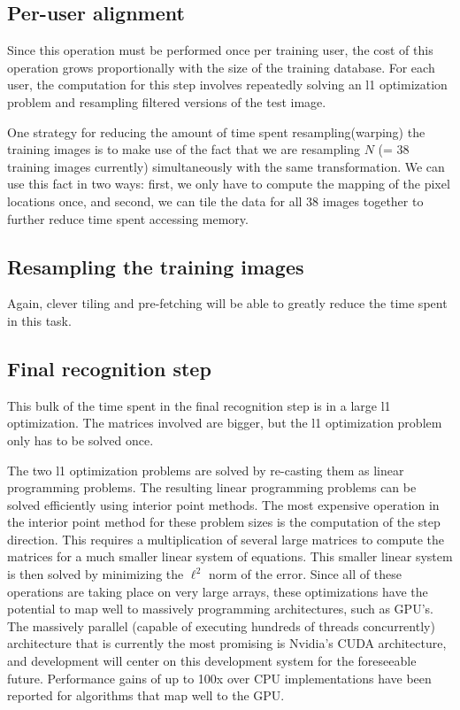 \subsection{Per-user alignment}  
Since this operation must be performed once per training user, the cost of this
operation grows proportionally with the size of the training database.  For
each user, the computation for this step involves repeatedly solving an l1
optimization problem and resampling filtered versions of the test image.  

One strategy for reducing the amount of time spent resampling(warping) the
training images is to make use of the fact that we are resampling $N$ (= 38
training images currently) simultaneously with the same transformation.  We can
use this fact in two ways: first, we only have to compute the mapping of the
pixel locations once, and second, we can tile the data for all 38 images
together to further reduce time spent accessing memory.   

\subsection{Resampling the training images}  
Again, clever tiling and pre-fetching will be able to greatly reduce the time spent in this task.

\subsection{Final recognition step}
This bulk of the time spent in the final recognition step is in a large l1 optimization.  The matrices involved are bigger, but the l1 optimization problem only has to be solved once.  

The two l1 optimization problems are solved by re-casting them as linear
programming problems.  The resulting linear programming problems can be solved
efficiently using interior point methods.  The most expensive operation in the
interior point method for these problem sizes is the computation of the step
direction.  This requires a multiplication of several large matrices to compute
the matrices for a much smaller linear system of equations.  This smaller
linear system is then solved by minimizing the $\ell^2$ norm of the error.
Since all of these operations are taking place on very large arrays, these
optimizations have the potential to map well to massively programming
architectures, such as GPU's.  The massively parallel (capable of executing
hundreds of threads concurrently) architecture that is currently the most
promising is Nvidia's CUDA architecture, and development will center on this
development system for the foreseeable future.  Performance gains of up to 100x
over CPU implementations have been reported for algorithms that map well to the
GPU.


